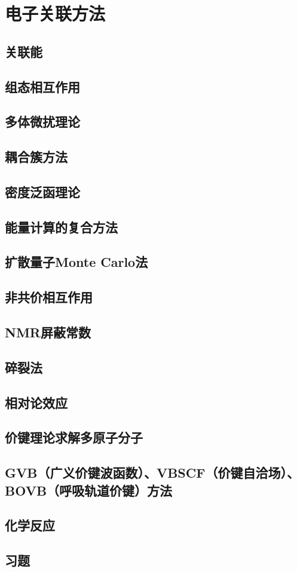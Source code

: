\chapter{电子关联方法}
\section{关联能}

\section{组态相互作用}

\section{多体微扰理论}

\section{耦合簇方法}

\section{密度泛函理论}

\section{能量计算的复合方法}

\section{扩散量子Monte Carlo法}

\section{非共价相互作用}

\section{NMR屏蔽常数}

\section{碎裂法}

\section{相对论效应}

\section{价键理论求解多原子分子}

\section{GVB（广义价键波函数）、VBSCF（价键自洽场）、BOVB（呼吸轨道价键）方法}

\section{化学反应}

\section*{习题}
